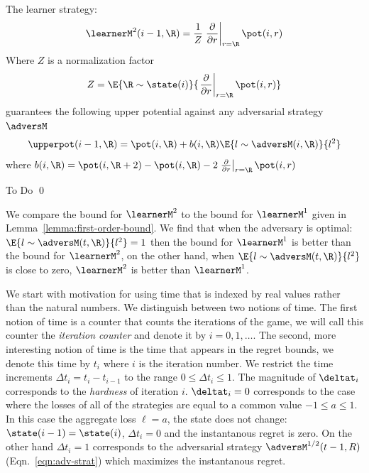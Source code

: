   \begin{lemma} \label{lemma:second-order-bound}
      The learner strategy:
      \begin{equation} \label{eqn:learner-strat-2}
      \learnerM^2(i-1,\R) =  \frac{1}{Z}
      \left. \frac{\partial}{\partial r} \right|_{r=\R} \pot(i,r)
      \end{equation}
      Where $Z$ is a normalization factor
      $$Z = \E{\R \sim \state(i)}{\left. \frac{\partial}{\partial r} \right|_{r=\R} \pot(i,r)}$$
      guarantees the following upper potential against any adversarial
      strategy $\adversM$
      \begin{equation} \label{eqn:value-iteration-upper}
        \upperpot(i-1, \R) = \pot(i,\R) + b(i,\R) \E{l \sim \adversM(i,\R)}{l^2}
      \end{equation}
      where $b(i,\R) = \pot(i,\R+2) -\pot(i,\R) - 2 \left. \frac{\partial}{\partial r} \right|_{r=\R} \pot(i,r)$
   \end{lemma}

   \proof
   To Do
   \qed
   
We compare the bound for $\learnerM^2$ to the bound for $\learnerM^1$
given in Lemma~\ref{lemma:first-order-bound}. We find that when the 
adversary is optimal: $\E{l \sim \adversM(t,\R)}{l^2}=1$ then the
bound for $\learnerM^1$ is better than the bound for $\learnerM^2$, on the
other hand, when $\E{l \sim \adversM(t,\R)}{l^2}$ is close to zero,
$\learnerM^2$ is better than $\learnerM^1$.  

\fi

\iffalse
We start with motivation for using time that is indexed by real
values rather than the natural numbers. We distinguish between two
notions of time. The first notion of time is a counter that
counts the iterations of the game, we will call this counter the {\em
  iteration counter } and denote it by $i=0,1,\ldots$. The second,
more interesting notion of time is the time that appears in the regret
bounds, we denote this time by $t_i$ where $i$ is the iteration
number. We restrict the time increments $\Delta t_i =t_i-t_{i-1}$ to
the range $0\leq \Delta t_i \leq 1$.  The magnitude of $\deltat_i$
corresponds to the {\em hardness} of iteration $i$. $\deltat_i=0$
corresponds to the case where the losses of all of the strategies are
equal to a common value $-1 \leq a \leq 1$. In this case the aggregate
loss $\ell=a$, the state does not change:
$\state(i-1)=\state(i)$, $\Delta t_i=0$ and the instantanous regret is zero. On the
other hand $\Delta t_i=1$ corresponds to the adversarial strategy
$\adversM^{1/2}(t-1,R)$ (Eqn.~\ref{eqn:adv-strat}) which maximizes the
instantanous regret.

